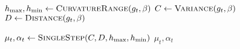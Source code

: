 %
\vspace{-0.25em}
\begin{algorithm}[h]
	\caption{\jianedits{\tuner}}
	\begin{algorithmic}
	\State $h_{\max}, h_{\min} \gets \Call{CurvatureRange}{g_t, \beta}$
	\State $C \gets \Call{Variance}{g_t, \beta}$ 
	\State $D \gets \Call{Distance}{g_t, \beta}$ 

	\State $\mu_t, \alpha_t \gets \Call{SingleStep}{C, D, h_{\max}, h_{\min}}$
	\Return $\mu_t, \alpha_t$
	\EndFunction
	\end{algorithmic}
	\label{alg:basic-algo}
\end{algorithm}
\vspace{-0.25em}
